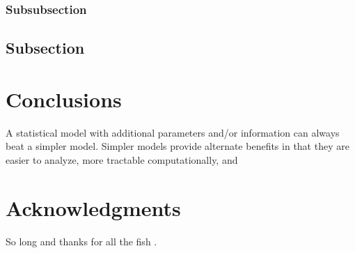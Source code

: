 \documentclass[fleqn,10pt]{SelfArx} %
\begin{document}
\subsubsection{Subsubsection}

\lipsum[14] %

\subsection{Subsection}

\lipsum[15-23] %


\section{Conclusions}
A statistical model with additional parameters and/or information can always beat a simpler model.  Simpler models provide alternate benefits in that they are easier to analyze, more tractable computationally, and 



\section*{Acknowledgments} %


So long and thanks for all the fish \cite{Figueredo:2009dg}.




\end{document}
